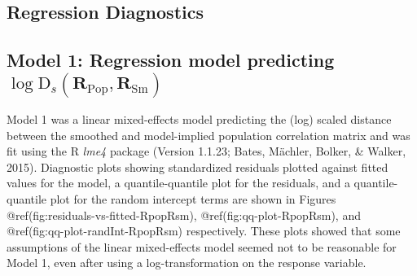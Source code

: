\clearpage
\makeatletter
\efloat@restorefloats
\makeatother


\begin{appendix}
\hypertarget{regression-diagnostics}{%
\section{Regression Diagnostics}\label{regression-diagnostics}}

\hypertarget{model-1-regression-model-predicting-log-textrmd_smathbfr_textrmpop-mathbfr_textrmsm}{%
\subsection{\texorpdfstring{Model 1: Regression model predicting
\(\log \textrm{D}_s(\mathbf{R}_{\textrm{Pop}}, \mathbf{R}_{\textrm{Sm}})\)}{Model 1: Regression model predicting \textbackslash log \textbackslash textrm\{D\}\_s(\textbackslash mathbf\{R\}\_\{\textbackslash textrm\{Pop\}\}, \textbackslash mathbf\{R\}\_\{\textbackslash textrm\{Sm\}\})}}\label{model-1-regression-model-predicting-log-textrmd_smathbfr_textrmpop-mathbfr_textrmsm}}

Model 1 was a linear mixed-effects model predicting the (log) scaled
distance between the smoothed and model-implied population correlation
matrix and was fit using the R \emph{lme4} package (Version 1.1.23;
Bates, Mächler, Bolker, \& Walker, 2015). Diagnostic plots showing
standardized residuals plotted against fitted values for the model, a
quantile-quantile plot for the residuals, and a quantile-quantile plot
for the random intercept terms are shown in Figures
@ref(fig:residuals-vs-fitted-RpopRsm), @ref(fig:qq-plot-RpopRsm), and
@ref(fig:qq-plot-randInt-RpopRsm) respectively. These plots showed that
some assumptions of the linear mixed-effects model seemed not to be
reasonable for Model 1, even after using a log-transformation on the
response variable.


\end{appendix}
